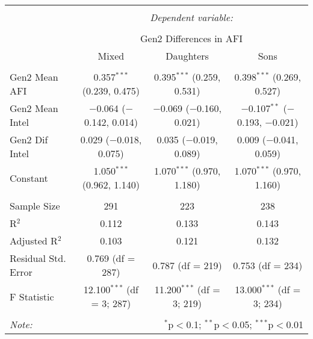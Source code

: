 
\begingroup 
\small 
\begin{tabular}{@{\extracolsep{1pt}}lccc} 
\\[-1.8ex]\hline 
\hline \\[-1.8ex] 
 & \multicolumn{3}{c}{\textit{Dependent variable:}} \\ 
\cline{2-4} 
\\[-1.8ex] & \multicolumn{3}{c}{Gen2 Differences in AFI} \\ 
 & Mixed & Daughters & Sons \\ 
\hline \\[-1.8ex] 
 Gen2 Mean AFI & 0.357$^{***}$ (0.239, 0.475) & 0.395$^{***}$ (0.259, 0.531) & 0.398$^{***}$ (0.269, 0.527) \\ 
  Gen2 Mean Intel & $-$0.064 ($-$0.142, 0.014) & $-$0.069 ($-$0.160, 0.021) & $-$0.107$^{**}$ ($-$0.193, $-$0.021) \\ 
  Gen2 Dif Intel & 0.029 ($-$0.018, 0.075) & 0.035 ($-$0.019, 0.089) & 0.009 ($-$0.041, 0.059) \\ 
  Constant & 1.050$^{***}$ (0.962, 1.140) & 1.070$^{***}$ (0.970, 1.180) & 1.070$^{***}$ (0.970, 1.160) \\ 
 \hline \\[-1.8ex] 
Sample Size & 291 & 223 & 238 \\ 
R$^{2}$ & 0.112 & 0.133 & 0.143 \\ 
Adjusted R$^{2}$ & 0.103 & 0.121 & 0.132 \\ 
Residual Std. Error & 0.769 (df = 287) & 0.787 (df = 219) & 0.753 (df = 234) \\ 
F Statistic & 12.100$^{***}$ (df = 3; 287) & 11.200$^{***}$ (df = 3; 219) & 13.000$^{***}$ (df = 3; 234) \\ 
\hline 
\hline \\[-1.8ex] 
\textit{Note:}  & \multicolumn{3}{r}{$^{*}$p$<$0.1; $^{**}$p$<$0.05; $^{***}$p$<$0.01} \\ 
\end{tabular} 
\endgroup 
